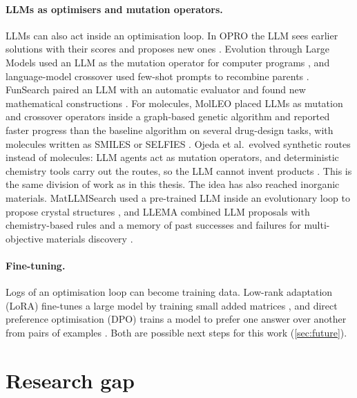 \paragraph{LLMs as optimisers and mutation operators.}
LLMs can also act inside an optimisation loop. In OPRO the LLM sees earlier solutions with their
scores and proposes new ones \cite{yang2024opro}. Evolution through Large Models used an LLM as the
mutation operator for computer programs \cite{lehman2022elm}, and language-model crossover used
few-shot prompts to recombine parents \cite{meyerson2023lmx}. FunSearch paired an LLM with an
automatic evaluator and found new mathematical constructions \cite{romeraparedes2024funsearch}.
For molecules, MolLEO placed LLMs as mutation and crossover operators inside a graph-based genetic
algorithm and reported faster progress than the baseline algorithm on several drug-design tasks,
with molecules written as SMILES or SELFIES \cite{wang2024molleo}. Ojeda et al.\ evolved synthetic
routes instead of molecules: LLM agents act as mutation operators, and deterministic chemistry
tools carry out the routes, so the LLM cannot invent products \cite{ojeda2026harness}. This is the
same division of work as in this thesis. The idea has also reached inorganic materials. MatLLMSearch
used a pre-trained LLM inside an evolutionary loop to propose crystal structures
\cite{gan2025matllmsearch}, and LLEMA combined LLM proposals with chemistry-based rules and a memory
of past successes and failures for multi-objective materials discovery \cite{abhyankar2026llema}.

\paragraph{Fine-tuning.}
Logs of an optimisation loop can become training data. Low-rank adaptation (LoRA) fine-tunes a
large model by training small added matrices \cite{hu2022lora}, and direct preference optimisation
(DPO) trains a model to prefer one answer over another from pairs of examples
\cite{rafailov2023dpo}. Both are possible next steps for this work (\cref{sec:future}).

\section{Research gap}
\label{sec:lit-gap}

